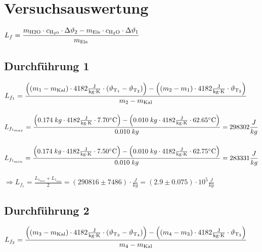 \documentclass[a4paper,12pt]{article}
\begin{document}
\section{Versuchsauswertung}

$L_{f}= \displaystyle{\frac{m_{\rm{H2O}} \cdot c_{\rm{H_2o}} \cdot \Delta\vartheta_2 - m_{\rm{Eis}} \cdot c_{\rm{H_2O}} \cdot \Delta\vartheta_1}{m_{\rm{Eis}}}}$

\subsection{Durchführung 1}

$L_{f_1}=\displaystyle{\frac{\left(\left(m_1-{m_{\rm{Kal}}}\right) \cdot 4182\rm{\frac{J}{kg \cdot K}}\cdot \left(\vartheta_{T_1}-\vartheta_{T_2}\right)\right)-\left(\left(m_2-m_{1}\right)\cdot 4182 \rm{\frac{J}{kg \cdot K}} \cdot \vartheta_{T_2}\right)}{m_2-{m_{\rm{Kal}}}}} $\\\\

$L_{f_{1_{max}}} =\displaystyle{\frac{\left(0.174\;kg \cdot 4182\rm{\frac{J}{kg \cdot K}}\cdot 7.70^{\circ}C \right)-\left(0.010\;kg\cdot 4182 \rm{\frac{J}{kg \cdot K}} \cdot 62.65^{\circ}C\right)}{0.010\;kg}} = 298302\frac{J}{kg}$\\\\

$L_{f_{1_{min}}} =\displaystyle{\frac{\left(0.174\;kg \cdot 4182\rm{\frac{J}{kg \cdot K}}\cdot 7.50^{\circ}C \right)-\left(0.010\;kg\cdot 4182 \rm{\frac{J}{kg \cdot K}} \cdot 62.75^{\circ}C\right)}{0.010\;kg}} = 283331\frac{J}{kg}$\\\\

$\Rightarrow L_{f_1}=\displaystyle{\frac{L_{1_{max}}+L_{1_{min}}}{2}=\left(290816\pm 7486\right) \cdot \frac{J}{kg}=\left(2.9\pm 0.075\right)\cdot 10^{5} \frac{J}{kg}}$

\subsection{Durchführung 2}

$L_{f_2}=\displaystyle{\frac{\left(\left(m_3-{m_{\rm{Kal}}}\right) \cdot 4182\rm{\frac{J}{kg \cdot K}}\cdot \left(\vartheta_{T_3}-\vartheta_{T_4}\right)\right)-\left(\left(m_4-m_{3}\right)\cdot 4182 \rm{\frac{J}{kg \cdot K}} \cdot \vartheta_{T_3}\right)}{m_4-{m_{\rm{Kal}}}}} $\\\\
\end{document}
